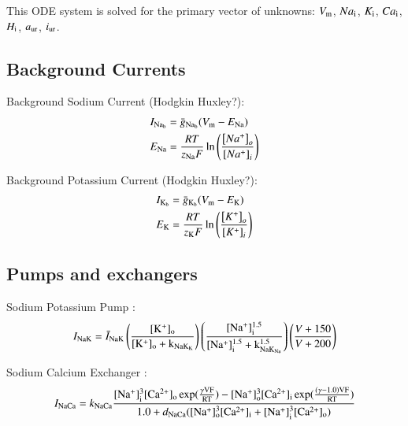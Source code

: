 This ODE system is solved for the primary vector of unknowns: $V_{\rm
m}$, $Na_{\rm i}$, $K_{\rm i}$, $Ca_{\rm i}$, $H_{\rm i}$, $a_{\rm
ur}$, $i_{\rm ur}$.

\subsection{Background Currents}
\label{sec:background-currents}

Background Sodium Current (Hodgkin Huxley?):
\begin{equation}
  \begin{split}
    I_{\rm Na_b} & = \bar{g}_{\rm Na_b} (V_{\rm m} - E_{\rm Na})\\
    E_{\rm Na} & =  \frac{R T}{z_{\rm Na} F}
    \ln\left(\frac{\left[Na^{+}\right]_{o}}
      {\left[Na^{+}\right]_{i}}\right)
  \end{split}
\end{equation}

Background Potassium Current (Hodgkin Huxley?):
\begin{equation}
  \begin{split}
    I_{\rm K_b} & = \bar{g}_{\rm K_b} (V_{\rm m} - E_{\rm K})\\
    E_{\rm K} & =  \frac{R T}{z_{\rm K} F}
    \ln\left(\frac{\left[K^{+}\right]_{o}}
      {\left[K^{+}\right]_{i}}\right)
  \end{split}
\end{equation}

\subsection{Pumps and exchangers}
\label{sec:pumps-and-exchangers}

Sodium Potassium Pump \citep[Table 12, pp. 77]{Nygrenetal1998}:
\begin{equation}
  I_{\rm NaK} =
  \bar{I}_{\rm NaK} \left( \frac{[\rm K^{+}]_{\rm o}}{[\rm K^{+}]_{\rm o} +
    k_{\rm NaK_{K}}} \right) \left(\frac{[\rm Na^{+}]^{1.5}_{\rm i}}{[\rm
    Na^{+}]^{1.5}_{\rm i} + k^{1.5}_{\rm NaK_{Na}}}\right) \left( \frac{V + 150}{V +
    200} \right)
\end{equation}

Sodium Calcium Exchanger \citep[Table 13, pp. 77]{Nygrenetal1998}:
\begin{equation}
  I_{\rm NaCa} = k_{\rm NaCa} \frac{[\rm Na^{+}]^{3}_{i}[\rm
    Ca^{2+}]_{o} \exp(\frac{\gamma V F}{R T}) - [\rm
    Na^{+}]^{3}_{o}[\rm Ca^{2+}]_{i} \exp(\frac{(\gamma - 1.0) V F}{R
      T})} {1.0 + d_{\rm NaCa}([\rm Na^{+}]^{3}_{o}[\rm Ca^{2+}]_{i} +
    [\rm Na^{+}]^{3}_{i}[\rm Ca^{2+}]_{o})}
\end{equation}

